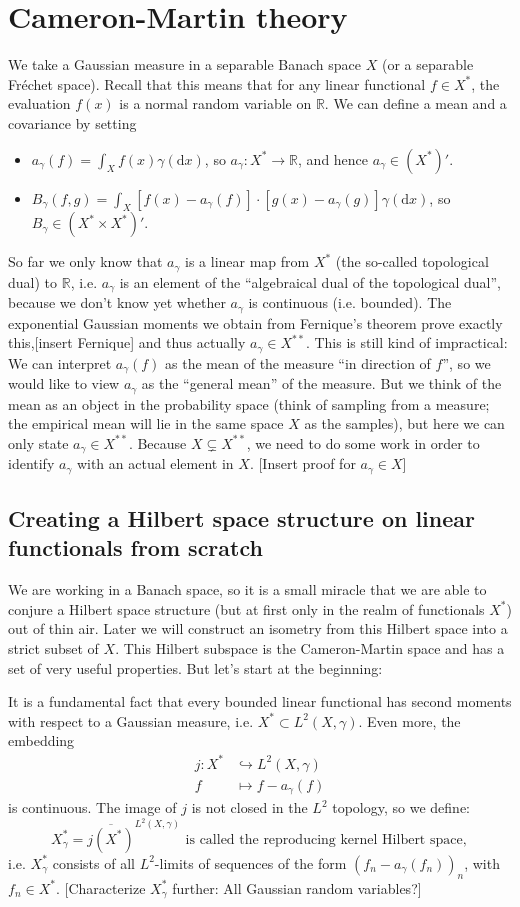 \documentclass{scrartcl}
\theoremstyle{definition}
\theoremstyle{remark}
\newcommand{\de}{\mathrm d}
\newcommand{\Frechet}{Fr\'echet }
\newcommand{\R}{\mathbb R}
\newcommand{\ednote}[1]{{\color{red}[#1]}}
\begin{document}
\section{Cameron-Martin theory}
We take a Gaussian measure in a separable Banach space $X$ (or a separable \Frechet space). Recall that this means that for any linear functional $f\in X^*$, the evaluation $f(x)$ is a normal random variable on $\R$. We can define a mean and a covariance by setting
\begin{itemize}
\item $a_\gamma(f) = \int_X f(x)\gamma(\de x)$, so $a_\gamma: X^*\to \R$, and hence $a_\gamma \in (X^*)'$.
\item $B_\gamma(f, g) = \int_X [f(x) - a_\gamma(f)]\cdot [g(x)-a_\gamma(g)]\gamma(\de x)$, so $B_\gamma \in (X^*\times X^*)'$.
\end{itemize}
So far we only know that $a_\gamma$ is a linear map from $X^*$ (the so-called topological dual) to $\R$, i.e. $a_\gamma$ is an element of the ``algebraical dual of the topological dual'', because we don't know yet whether $a_\gamma$ is continuous (i.e. bounded). The exponential Gaussian moments we obtain from Fernique's theorem prove exactly this,\ednote{insert Fernique} and thus actually $a_\gamma \in X^{**}$. This is still kind of impractical: We can interpret $a_\gamma(f)$ as the mean of the measure ``in direction of $f$'', so we would like to view $a_\gamma$ as the ``general mean'' of the measure. But we think of the mean as an object in the probability space (think of sampling from a measure; the empirical mean will lie in the same space $X$ as the samples), but here we can only state $a_\gamma \in X^{**}$. Because $X \subsetneq X^{**}$, we need to do some work in order to identify $a_\gamma$ with an actual element in $X$. \ednote{Insert proof for $a_\gamma \in X$}
\subsection{Creating a Hilbert space structure on linear functionals from scratch}
We are working in a Banach space, so it is a small miracle that we are able to conjure a Hilbert space structure (but at first only in the realm of functionals $X^*$) out of thin air. Later we will construct an isometry from this Hilbert space into a strict subset of $X$. This Hilbert subspace is the Cameron-Martin space and has a set of very useful properties. But let's start at the beginning:

It is a fundamental fact that every bounded linear functional has second moments with respect to a Gaussian measure, i.e. $X^*\subset L^2(X, \gamma)$. Even more, the embedding
\begin{align*}
j: X^* &\hookrightarrow L^2(X, \gamma)\\
f &\mapsto f - a_\gamma(f)
\end{align*}
is continuous. 
The image of $j$ is not closed in the $L^2$ topology, so we define:
\[ X_\gamma^* = \overline{j(X^*)}^{L^2(X,\gamma)} \text{ is called the reproducing kernel Hilbert space},\]
i.e. $X_\gamma^*$ consists of all $L^2$-limits of sequences of the form $(f_n-a_\gamma(f_n))_n$, with $f_n\in X^*$. \ednote{Characterize $X_\gamma^*$ further: All Gaussian random variables?}
\end{document}
